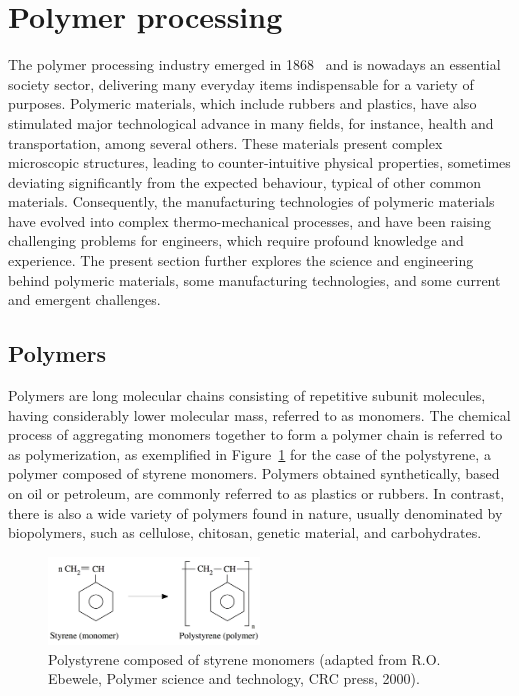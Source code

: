 \section{Polymer processing}
\label{chap1:sec:polymer_processing}

The polymer processing industry emerged in 1868~\cite{chap1:2002ebewele} and is nowadays an essential society sector, delivering many everyday items indispensable for a variety of purposes.
Polymeric materials, which include rubbers and plastics, have also stimulated major technological advance in many fields, for instance, health and transportation, among several others.
These materials present complex microscopic structures, leading to counter-intuitive physical properties, sometimes deviating significantly from the expected behaviour, typical of other common materials.
Consequently, the manufacturing technologies of polymeric materials have evolved into complex thermo-mechanical processes, and have been raising challenging problems for engineers, which require profound knowledge and experience.
The present section further explores the science and engineering behind polymeric materials, some manufacturing technologies, and some current and
emergent challenges.

\subsection{Polymers}
\label{chap1:subsec:polymer_processing_polymers}

Polymers are long molecular chains consisting of repetitive subunit molecules, having considerably lower molecular mass, referred to as monomers.
The chemical process of aggregating monomers together to form a polymer chain is referred to as polymerization, as exemplified in Figure~\ref{chap1:fig:polymer_processing_polymerization} for the case of the polystyrene, a polymer composed of styrene monomers.
Polymers obtained synthetically, based on oil or petroleum, are commonly referred to as plastics or rubbers.
In contrast, there is also a wide variety of polymers found in nature, usually denominated by biopolymers, such as cellulose, chitosan, genetic material, and carbohydrates.

\begin{figure}[!htb]
\centering
\includegraphics[width=0.5\textwidth]{chap1/include/figures/polymerization.png}
\caption[Polystyrene composed of styrene monomers.]{Polystyrene composed of styrene monomers (adapted from R.O. Ebewele, Polymer science and technology, CRC press, 2000).}
\label{chap1:fig:polymer_processing_polymerization}
\end{figure}

